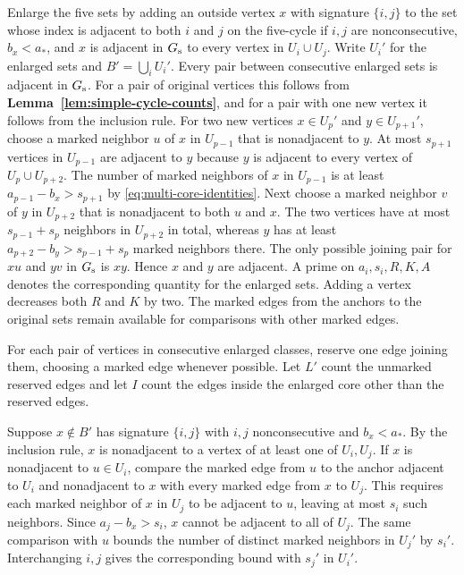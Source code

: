 \documentclass[preprint,11pt,numbers]{elsarticle-arxiv}
\numberwithin{equation}{section}
\theoremstyle{definition}
\begin{document}
Enlarge the five sets by adding an outside vertex $x$ with signature
$\{i,j\}$ to the set whose index is adjacent to both $i$ and $j$
on the five-cycle if $i,j$ are nonconsecutive, $b_x<a_*$, and $x$
is adjacent in $G_{\rm s}$ to every vertex in $U_i\cup U_j$.
Write $U_i'$ for the enlarged sets and $B'=\bigcup_i U_i'$.
Every pair between consecutive enlarged sets is adjacent in
$G_{\rm s}$. For a pair of original vertices this follows from
\textbf{Lemma~\ref{lem:simple-cycle-counts}}, and for a pair with one
new vertex it follows from the inclusion rule. For two new vertices
$x\in U_p'$ and $y\in U_{p+1}'$, choose a marked neighbor $u$ of
$x$ in $U_{p-1}$ that is nonadjacent to $y$. At most $s_{p+1}$
vertices in $U_{p-1}$ are adjacent to $y$ because $y$ is adjacent
to every vertex of $U_p\cup U_{p+2}$. The number of marked neighbors
of $x$ in $U_{p-1}$ is at least $a_{p-1}-b_x>s_{p+1}$ by
\eqref{eq:multi-core-identities}. Next choose a marked neighbor $v$
of $y$ in $U_{p+2}$ that is nonadjacent to both $u$ and $x$.
The two vertices have at most $s_{p-1}+s_p$ neighbors in $U_{p+2}$
in total, whereas $y$ has at least $a_{p+2}-b_y>s_{p-1}+s_p$
marked neighbors there. The only possible joining pair for $xu$
and $yv$ in $G_{\rm s}$ is $xy$. Hence $x$ and $y$ are adjacent.
A prime on $a_i,s_i,R,K,A$ denotes the corresponding quantity for
the enlarged sets. Adding a vertex decreases both $R$ and $K$ by two.
The marked edges from the anchors to the original sets remain
available for comparisons with other marked edges.

For each pair of vertices in consecutive enlarged classes, reserve
one edge joining them, choosing a marked edge whenever possible.
Let $L'$ count the unmarked reserved edges and let $I$ count the
edges inside the enlarged core other than the reserved edges.

Suppose $x\notin B'$ has signature $\{i,j\}$ with $i,j$
nonconsecutive and $b_x<a_*$. By the inclusion rule, $x$ is
nonadjacent to a vertex of at least one of $U_i,U_j$. If $x$ is
nonadjacent to $u\in U_i$, compare the marked edge from $u$ to the
anchor adjacent to $U_i$ and nonadjacent to $x$ with every marked
edge from $x$ to $U_j$. This requires each marked neighbor of $x$
in $U_j$ to be adjacent to $u$, leaving at most $s_i$ such
neighbors. Since $a_j-b_x>s_i$, $x$ cannot be adjacent to all of
$U_j$. The same comparison with $u$ bounds the number of distinct
marked neighbors in $U_j'$ by $s_i'$. Interchanging $i,j$ gives
the corresponding bound with $s_j'$ in $U_i'$.
\end{document}
